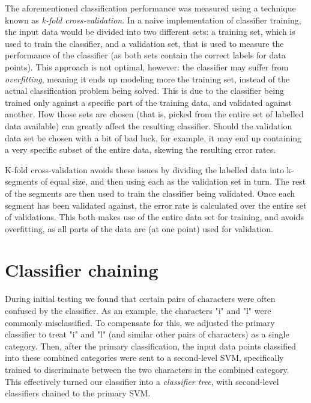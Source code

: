 \documentclass{netsec2012}
\begin{document}
The aforementioned classification performance was measured using a technique known as \emph{k-fold
cross-validation}.  In a naive implementation of classifier training, the input data would be
divided into two different sets: a training set, which is used to train the classifier, and a
validation set, that is used to measure the performance of the classifier (as both sets contain the
correct labels for data points).  This approach is not optimal, however: the classifier may suffer
from \emph{overfitting}, meaning it ends up modeling more the training set, instead of the actual
classification problem being solved.  This is due to the classifier being trained only against a
specific part of the training data, and validated against another.  How those sets are chosen (that
is, picked from the entire set of labelled data available) can greatly affect the resulting
classifier.  Should the validation data set be chosen with a bit of bad luck, for example, it may
end up containing a very specific subset of the entire data, skewing the resulting error rates.

K-fold cross-validation avoids these issues by dividing the labelled data into k-segments of equal
size, and then using each as the validation set in turn.  The rest of the segments are then used to
train the classifier being validated.  Once each segment has been validated against, the error rate
is calculated over the entire set of validations.  This both makes use of the entire data set for
training, and avoids overfitting, as all parts of the data are (at one point) used for validation.


\section{Classifier chaining}

During initial testing we found that certain pairs of characters were often confused by the
classifier.  As an example, the characters "i" and "l" were commonly misclassified.  To compensate
for this, we adjusted the primary classifier to treat "i" and "l" (and similar other pairs of
characters) as a single category.  Then, after the primary classification, the input data points
classified into these combined categories were sent to a second-level SVM, specifically trained to
discriminate between the two characters in the combined category.  This effectively turned our
classifier into a \emph{classifier tree}, with second-level classifiers chained to the primary SVM.
\end{document}

